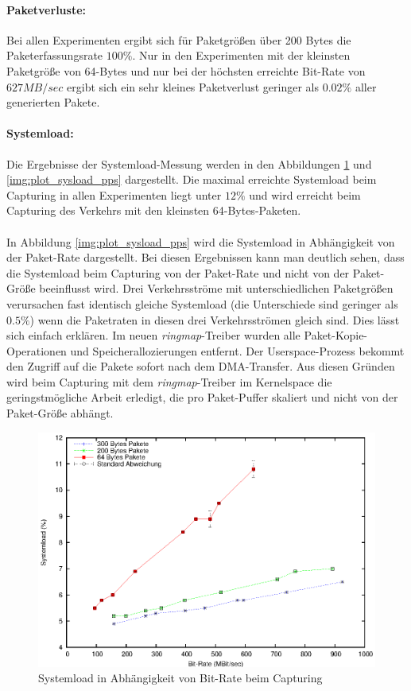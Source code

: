 \paragraph*{Paketverluste:} Bei allen Experimenten ergibt sich für Paketgrößen
über 200 Bytes die Paketerfassungsrate $100\%$. Nur in den Experimenten mit der
kleinsten Paketgröße von 64-Bytes und nur bei der höchsten erreichte Bit-Rate
von $627 MB/sec$ ergibt sich ein sehr kleines Paketverlust geringer als
$0.02\%$ aller generierten Pakete.
%
\paragraph*{Systemload:}
Die Ergebnisse der Systemload-Messung werden in den Abbildungen
\ref{img:plot_sysload_mbs} und \ref{img:plot_sysload_pps} dargestellt. Die
maximal erreichte Systemload beim Capturing in allen Experimenten liegt unter
$12\%$ und wird erreicht beim Capturing des Verkehrs mit den kleinsten
64-Bytes-Paketen.\\\\
%
In Abbildung \ref{img:plot_sysload_pps} wird die Systemload in Abhängigkeit von
der Paket-Rate dargestellt. Bei diesen Ergebnissen kann man deutlich sehen,
dass die Systemload beim Capturing von der Paket-Rate und nicht von der
Paket-Größe beeinflusst wird. Drei Verkehrsströme mit unterschiedlichen
Paketgrößen verursachen fast identisch gleiche Systemload (die Unterschiede
sind geringer als $0.5\%$) wenn die Paketraten in diesen drei Verkehrsströmen
gleich sind.  Dies lässt sich einfach erklären. Im neuen \emph{ringmap}-Treiber
wurden alle Paket-Kopie-Operationen und Speicherallozierungen entfernt. Der
Userspace-Prozess bekommt den Zugriff auf die Pakete sofort nach dem
DMA-Transfer. Aus diesen Gründen wird beim Capturing mit dem
\emph{ringmap}-Treiber im Kernelspace die geringstmögliche Arbeit erledigt, die
pro Paket-Puffer skaliert und nicht von der Paket-Größe abhängt.
%
\begin{figure} 
\centering \includegraphics[width=5.5in]{plots/graphs/sysload_single_CPU_pcie_mbs}
\caption{Systemload in Abhängigkeit von Bit-Rate beim Capturing}
\label{img:plot_sysload_mbs}
\end{figure}
